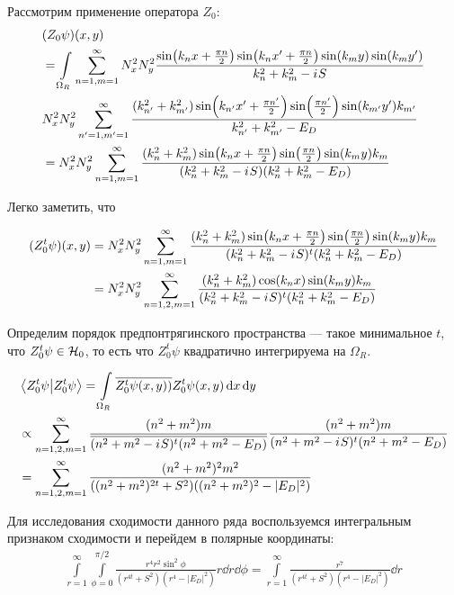 Рассмотрим применение оператора $Z_0$:
\begin{align*}
& (Z_0 \psi)(x, y) \\
&= \int\limits_{\Omega_R} \sum\limits_{n = 1, m = 1}^\infty N_x^2 N_y^2 \frac{\sin(k_n x + \frac{\pi n}{2}) \sin(k_n x' + \frac{\pi n}{2}) \sin(k_m y) \sin(k_m y')}{k^2_n + k^2_m - {i\mkern1mu} S} \\
& N_x^2 N_y^2 \sum\limits_{n' = 1, m' = 1}^\infty \frac{(k_{n'}^2 + k_{m'}^2) \sin(k_{n'} x' + \frac{\pi n'}{2}) \sin(\frac{\pi n'}{2}) \sin(k_{m'} y') k_{m'}}{k_{n'}^2 + k_{m'}^2 - E_D} \\
&= N_x^2 N_y^2 \sum\limits_{n = 1, m = 1}^\infty \frac{(k_n^2 + k_m^2) \sin(k_n x + \frac{\pi n}{2}) \sin(\frac{\pi n}{2}) \sin(k_m y) k_m}{(k_n^2 + k_m^2 - {i\mkern1mu} S) (k_n^2 + k_m^2 - E_D)}
\end{align*}

Легко заметить, что 

\begin{align*}
(Z_0^t \psi)(x, y)
&= N_x^2 N_y^2 \sum\limits_{n = 1, m = 1}^\infty \frac{(k_n^2 + k_m^2) \sin(k_n x + \frac{\pi n}{2}) \sin(\frac{\pi n}{2}) \sin(k_m y) k_m}{(k_n^2 + k_m^2 - {i\mkern1mu} S)^t (k_n^2 + k_m^2 - E_D)} \\
&= N_x^2 N_y^2 \sum\limits_{n = 1,2, m = 1}^\infty \frac{(k_n^2 + k_m^2) \cos(k_n x) \sin(k_m y) k_m}{(k_n^2 + k_m^2 - {i\mkern1mu} S)^t (k_n^2 + k_m^2 - E_D)}
\end{align*}


Определим порядок предпонтрягинского пространства — такое минимальное $t$, что $Z_0^t \psi \in \mathcal{H}_{0}$, то есть что $Z_0^t \psi$ квадратично интегрируема на $\Omega_R$.

\begin{align*}
& \ip{Z_0^t \psi}{Z_0^t \psi} = \int\limits_{\Omega_R} \cconj{Z_0^t \psi(x, y))} Z_0^t \psi(x, y) \dd{x} \dd{y} \\
&\propto \sum\limits_{n = 1,2, m = 1}^\infty \frac{(n^2 + m^2) m}{\cconj{(n^2 + m^2 - \iu S)^t (n^2 + m^2 - E_D)}} \frac{(n^2 + m^2) m}{(n^2 + m^2 - \iu S)^t (n^2 + m^2 - E_D)} \\
&= \sum\limits_{n = 1,2, m = 1}^\infty \frac{(n^2 + m^2)^2 m^2}{((n^2 + m^2)^{2t} + S^2) ((n^2 + m^2)^{2} - |E_D|^2)} 
\end{align*}

Для исследования сходимости данного ряда воспользуемся интегральным признаком сходимости и перейдем в полярные координаты:
\begin{align*}
\int\limits_{r = 1}^\infty \int\limits_{\phi = 0}^{\pi / 2} \frac{r^4 r^2 \sin^2 \phi}{(r^{4t} + S^2) (r^{4} - |E_D|^2)} r \dd{r} \dd{\phi}
= \int\limits_{r = 1}^\infty \frac{r^7}{(r^{4t} + S^2) (r^{4} - |E_D|^2)} \dd{r}
\end{align*}


